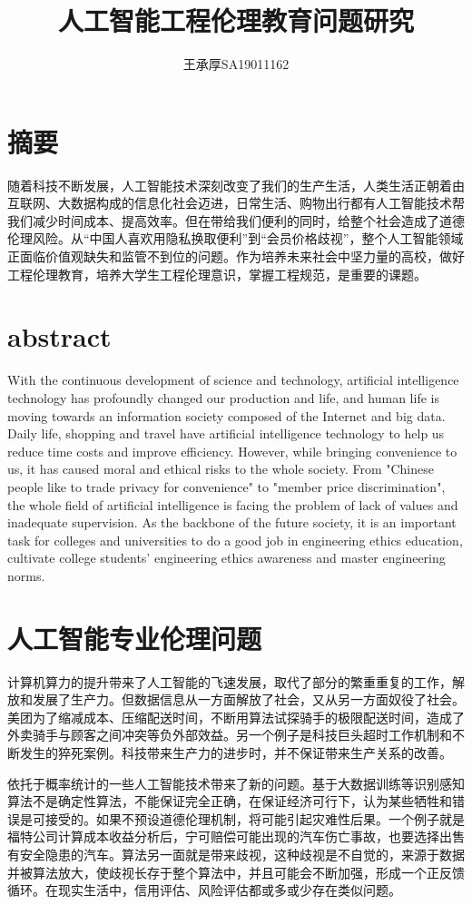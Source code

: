 \documentclass{ctexart}
\title{人工智能工程伦理教育问题研究}
\author{王承厚SA19011162}
\begin{document}
\maketitle
\section{摘要}
随着科技不断发展，人工智能技术深刻改变了我们的生产生活，人类生活正朝着由互联网、大数据构成的信息化社会迈进，日常生活、购物出行都有人工智能技术帮我们减少时间成本、提高效率。但在带给我们便利的同时，给整个社会造成了道德伦理风险。从“中国人喜欢用隐私换取便利”到“会员价格歧视”，整个人工智能领域正面临价值观缺失和监管不到位的问题。作为培养未来社会中坚力量的高校，做好工程伦理教育，培养大学生工程伦理意识，掌握工程规范，是重要的课题。

\section{abstract}
With the continuous development of science and technology, artificial intelligence technology has profoundly changed our production and life, and human life is moving towards an information society composed of the Internet and big data. Daily life, shopping and travel have artificial intelligence technology to help us reduce time costs and improve efficiency. However, while bringing convenience to us, it has caused moral and ethical risks to the whole society. From "Chinese people like to trade privacy for convenience" to "member price discrimination", the whole field of artificial intelligence is facing the problem of lack of values and inadequate supervision. As the backbone of the future society, it is an important task for colleges and universities to do a good job in engineering ethics education, cultivate college students' engineering ethics awareness and master engineering norms.

\section{人工智能专业伦理问题}
计算机算力的提升带来了人工智能的飞速发展，取代了部分的繁重重复的工作，解放和发展了生产力。但数据信息从一方面解放了社会，又从另一方面奴役了社会。美团为了缩减成本、压缩配送时间，不断用算法试探骑手的极限配送时间，造成了外卖骑手与顾客之间冲突等负外部效益。另一个例子是科技巨头超时工作机制和不断发生的猝死案例。科技带来生产力的进步时，并不保证带来生产关系的改善。

依托于概率统计的一些人工智能技术带来了新的问题。基于大数据训练等识别感知算法不是确定性算法，不能保证完全正确，在保证经济可行下，认为某些牺牲和错误是可接受的。如果不预设道德伦理机制，将可能引起灾难性后果。一个例子就是福特公司计算成本收益分析后，宁可赔偿可能出现的汽车伤亡事故，也要选择出售有安全隐患的汽车。算法另一面就是带来歧视，这种歧视是不自觉的，来源于数据并被算法放大，使歧视长存于整个算法中，并且可能会不断加强，形成一个正反馈循环。在现实生活中，信用评估、风险评估都或多或少存在类似问题。
\end{document}
